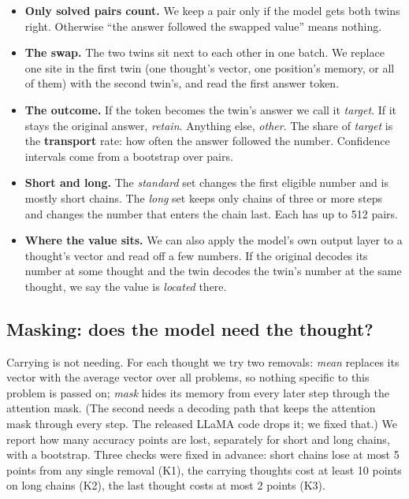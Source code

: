\documentclass{article}
\begin{document}
\begin{itemize}
\item \textbf{Only solved pairs count.} We keep a pair only if the model gets both twins right. Otherwise ``the answer followed the swapped value'' means nothing.
\item \textbf{The swap.} The two twins sit next to each other in one batch. We replace one site in the first twin (one thought's vector, one position's memory, or all of them) with the second twin's, and read the first answer token.
\item \textbf{The outcome.} If the token becomes the twin's answer we call it \emph{target}. If it stays the original answer, \emph{retain}. Anything else, \emph{other}. The share of \emph{target} is the \textbf{transport} rate: how often the answer followed the number. Confidence intervals come from a bootstrap over pairs.
\item \textbf{Short and long.} The \emph{standard} set changes the first eligible number and is mostly short chains. The \emph{long} set keeps only chains of three or more steps and changes the number that enters the chain last. Each has up to 512 pairs.
\item \textbf{Where the value sits.} We can also apply the model's own output layer to a thought's vector and read off a few numbers. If the original decodes its number at some thought and the twin decodes the twin's number at the same thought, we say the value is \emph{located} there.
\end{itemize}

\subsection{Masking: does the model need the thought?}

Carrying is not needing. For each thought we try two removals: \emph{mean} replaces its vector with the average vector over all problems, so nothing specific to this problem is passed on; \emph{mask} hides its memory from every later step through the attention mask. (The second needs a decoding path that keeps the attention mask through every step. The released LLaMA code drops it; we fixed that.) We report how many accuracy points are lost, separately for short and long chains, with a bootstrap. Three checks were fixed in advance: short chains lose at most 5 points from any single removal (K1), the carrying thoughts cost at least 10 points on long chains (K2), the last thought costs at most 2 points (K3).
\end{document}
